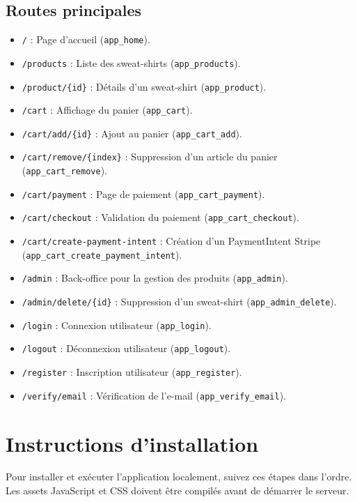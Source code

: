 \documentclass[a4paper,11pt]{article}
\begin{document}
\subsection{Routes principales}
\begin{itemize}
    \item \texttt{/} : Page d'accueil (\texttt{app\_home}).
    \item \texttt{/products} : Liste des sweat-shirts (\texttt{app\_products}).
    \item \texttt{/product/\{id\}} : Détails d'un sweat-shirt (\texttt{app\_product}).
    \item \texttt{/cart} : Affichage du panier (\texttt{app\_cart}).
    \item \texttt{/cart/add/\{id\}} : Ajout au panier (\texttt{app\_cart\_add}).
    \item \texttt{/cart/remove/\{index\}} : Suppression d'un article du panier (\texttt{app\_cart\_remove}).
    \item \texttt{/cart/payment} : Page de paiement (\texttt{app\_cart\_payment}).
    \item \texttt{/cart/checkout} : Validation du paiement (\texttt{app\_cart\_checkout}).
    \item \texttt{/cart/create-payment-intent} : Création d'un PaymentIntent Stripe (\texttt{app\_cart\_create\_payment\_intent}).
    \item \texttt{/admin} : Back-office pour la gestion des produits (\texttt{app\_admin}).
    \item \texttt{/admin/delete/\{id\}} : Suppression d'un sweat-shirt (\texttt{app\_admin\_delete}).
    \item \texttt{/login} : Connexion utilisateur (\texttt{app\_login}).
    \item \texttt{/logout} : Déconnexion utilisateur (\texttt{app\_logout}).
    \item \texttt{/register} : Inscription utilisateur (\texttt{app\_register}).
    \item \texttt{/verify/email} : Vérification de l'e-mail (\texttt{app\_verify\_email}).
\end{itemize}

\section{Instructions d'installation}
Pour installer et exécuter l'application localement, suivez ces étapes dans l’ordre. Les assets JavaScript et CSS doivent être compilés avant de démarrer le serveur.
\end{document}
